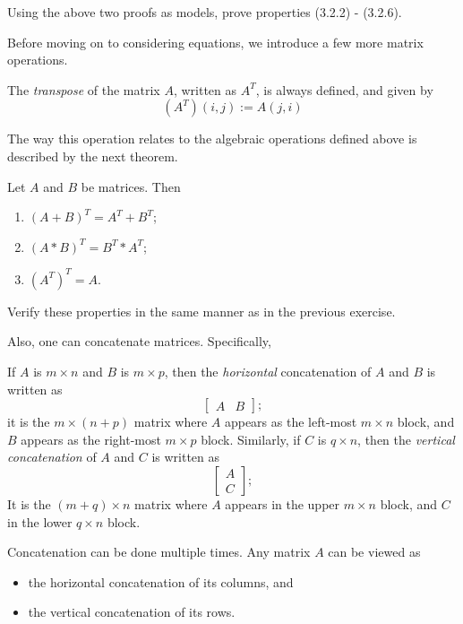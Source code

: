 \documentclass{ximera}
\begin{document}
\begin{exercise} Using the above two proofs as models, prove properties (3.2.2) - (3.2.6).
\end{exercise}

Before moving on to considering equations, we introduce a few more matrix operations.

\begin{definition} The {\it transpose} of the matrix $A$, written as $A^T$, is always defined, and given by
\[
\left(A^T\right)(i,j) := A(j,i)
\]
\end{definition}
The way this operation relates to the algebraic operations defined above is described by the next theorem.

\begin{theorem} Let $A$ and $B$ be matrices. Then
\begin{enumerate}
\item $(A+B)^T = A^T + B^T$;
\item $(A*B)^T = B^T*A^T$;
\item $\left(A^T\right)^T = A$.
\end{enumerate}
\end{theorem}

\begin{exercise} Verify these properties in the same manner as in the previous exercise.
\end{exercise}

Also, one can concatenate matrices. Specifically,

\begin{definition} If $A$ is $m\times n$ and $B$ is $m\times p$, then the {\it horizontal} concatenation of $A$ and $B$ is written as
\[
\begin{bmatrix} 
A & B
\end{bmatrix};
\] 
it is the $m\times (n+p)$ matrix where $A$ appears as the left-most $m\times n$ block, and $B$ appears as the right-most $m\times p$ block. Similarly, if $C$ is $q\times n$, then the {\it vertical concatenation} of $A$ and $C$ is written as
\[
\begin{bmatrix} 
A\\ C
\end{bmatrix};
\]
It is the $(m+q)\times n$ matrix where $A$ appears in the upper $m\times n$ block, and $C$ in the lower $q\times n$ block.
\end{definition}
Concatenation can be done multiple times. Any matrix $A$ can be viewed as 
\begin{itemize}
\item the horizontal concatenation of its columns, and
\item the vertical concatenation of its rows.
\end{itemize}
\end{document}
